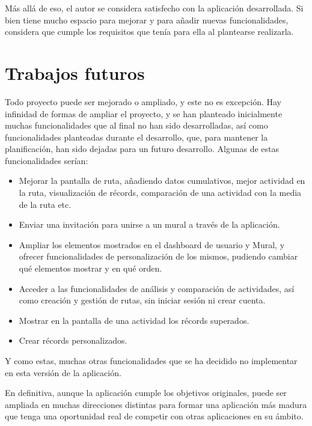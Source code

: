 Más allá de eso, el autor se considera satisfecho con la aplicación desarrollada. Si bien tiene mucho espacio para mejorar y para añadir nuevas funcionalidades, considera que cumple los requisitos que tenía para ella al plantearse realizarla.

\section{Trabajos futuros} 
Todo proyecto puede ser mejorado o ampliado, y este no es excepción. Hay infinidad de formas de ampliar el proyecto, y se han planteado inicialmente muchas funcionalidades que al final no han sido desarrolladas, así como funcionalidades planteadas durante el desarrollo, que, para mantener la planificación, han sido dejadas para un futuro desarrollo. Algunas de estas funcionalidades serían: 
\begin{itemize}
    \item Mejorar la pantalla de ruta, añadiendo datos cumulativos, mejor actividad en la ruta, visualización de récords, comparación de una actividad con la media de la ruta etc.
    \item Enviar una invitación para unirse a un mural a través de la aplicación.
    \item Ampliar los elementos mostrados en el dashboard de usuario y Mural, y ofrecer funcionalidades de personalización de los mismos, pudiendo cambiar qué elementos mostrar y en qué orden.
    \item Acceder a las funcionalidades de análisis y comparación de actividades, así como creación y gestión de rutas, sin iniciar sesión ni crear cuenta.
    \item Mostrar en la pantalla de una actividad los récords superados.
    \item Crear récords personalizados.
\end{itemize}

Y como estas, muchas otras funcionalidades que se ha decidido no implementar en esta versión de la aplicación.


En definitiva, aunque la aplicación cumple los objetivos originales, puede ser ampliada en muchas direcciones distintas para formar una aplicación más madura que tenga una oportunidad real de competir con otras aplicaciones en su ámbito.
